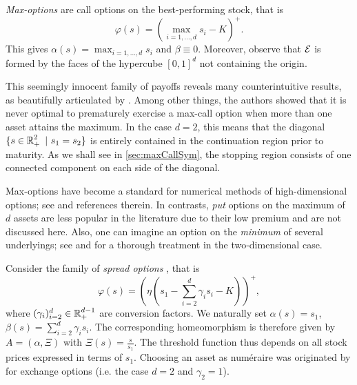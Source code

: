 \begin{example}\label{ex:max}
\textit{Max-options} are call options  on the best-performing stock, that is
$$
\varphi(s)= \left(  \max_{i=1,...,d} s_i - K  \right)^{+}.
$$
This gives $\alpha(s)=\max_{i=1,...,d} s_i$ and $\beta\equiv 0$.  
Moreover, observe that 
$\operatorname{\mathcal{E}}$  is formed by the faces of the  hypercube $[0,1]^d $ not containing the origin. %

This seemingly innocent family of payoffs reveals many counterintuitive results, as beautifully articulated by \citet{BroadieDetemple}. Among other things, the authors showed that it is never optimal to prematurely exercise a max-call option when more than one asset attains the maximum. In the case $d=2$, this means that the diagonal $\{s \in \R^2_+ \ | \  s_1 = s_2\}$ is entirely contained in the continuation region prior to maturity. As we shall see in \cref{sec:maxCallSym},  the stopping region consists of one connected
component on each side of the diagonal. 

Max-options have become a standard for numerical methods of high-dimensional options; see \cite{Becker1,Becker2} and references therein. 
In contrasts, \textit{put} options on the maximum of $d$ assets are less popular in the literature due to their low premium and are not discussed here. 
Also, one can imagine an option on the \textit{minimum} of several underlyings; see \cite[Chapter 6]{DetempleBook} and \cite{DetempleMin} for a thorough treatment in the two-dimensional case. %
\end{example}

\begin{example}\label{ex:spread}
Consider the family of \textit{spread options} \cite{Carmona},  that is 
$$
\varphi(s)= \left( \eta  \left ( s_1 - \sum_{i=2}^{d}\gamma_i s_i - K \right) \right)^{+},
$$
where  $(\gamma_{i})_{i=2}^d \in \operatorname{\mathbb{R}}^{d-1}_+$ are conversion factors. We naturally set $\alpha(s)=s_1$, $\beta(s)=\sum_{i=2}^{d}\gamma_i s_i$. The corresponding homeomorphism is therefore given by 
$A=(\alpha,\Xi)$ with  $\Xi(s)=\frac{s}{s_1}.$ The threshold function thus depends on all stock prices expressed in terms of $s_1$. 
Choosing an asset as numéraire %
was originated by \citet{Margrabe} for exchange options (i.e. the case $d=2$  and $\gamma_2=1$). 
\end{example}

